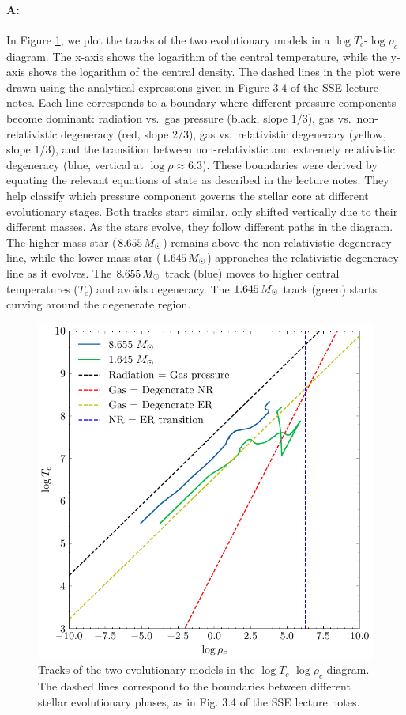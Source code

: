 \documentclass[twocolumn,fontsize=11pt]{scrartcl}
\begin{document}
\paragraph{A:} In Figure \ref{fig:q24_deg}, we plot the tracks of the two evolutionary models in a \(\log T_c\)-\(\log \rho_c\) diagram. The x-axis shows the logarithm of the central temperature, while the y-axis shows the logarithm of the central density. The dashed lines in the plot were drawn using the analytical expressions given in Figure 3.4 of the SSE lecture notes. Each line corresponds to a boundary where different pressure components become dominant: radiation vs.\ gas pressure (black, slope \(1/3\)), gas vs.\ non-relativistic degeneracy (red, slope \(2/3\)), gas vs.\ relativistic degeneracy (yellow, slope \(1/3\)), and the transition between non-relativistic and extremely relativistic degeneracy (blue, vertical at \(\log \rho \approx 6.3\)).  These boundaries were derived by equating the relevant equations of state as described in the lecture notes. They help classify which pressure component governs the stellar core at different evolutionary stages. Both tracks start similar, only shifted vertically due to their different masses. As the stars evolve, they follow different paths in the diagram. The higher-mass star (\(8.655\,M_\odot\)) remains above the non-relativistic degeneracy line, while the lower-mass star (\(1.645\,M_\odot\)) approaches the relativistic degeneracy line as it evolves.
The $8.655\,M_\odot$ track (blue) moves to higher central temperatures ($T_c$) and avoids degeneracy. The $1.645\,M_\odot$ track (green) starts curving around the degenerate region.

\begin{figure}[p]
    \centering
    \includegraphics{q24_deg.pdf}
    \caption{Tracks of the two evolutionary models in the \(\log T_c\)-\(\log \rho_c\) diagram. The dashed lines correspond to the boundaries between different stellar evolutionary phases, as in Fig. 3.4 of the SSE lecture notes.}
    \label{fig:q24_deg}
\end{figure}
\clearpage
\end{document}

